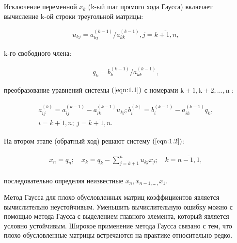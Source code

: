 \documentclass[a4paper]{article}
\begin{document}
Исключение переменной $x_{k}$ (k-ый шаг прямого хода Гаусса) включает вычисление k-ой строки треугольной матрицы:

\begin{equation}
    \label{eqn:1.3}
    \begin{aligned}
        u_{k j}=a_{k j}^{(k-1)} / a_{k k}^{(k-1)}, j=\overline{k+1, n},
    \end{aligned}
\end{equation}

$\mathrm{k}$-го свободного члена:

\begin{equation}
    \label{eqn:1.4}
    \begin{aligned}
        q_{k}=b_{k}^{(k-1)} / a_{k k}^{(k-1)},
    \end{aligned}
\end{equation}

преобразование уравнений системы $(\ref{eqn:1.1})$ с номерами $\mathrm{k}+1, \mathrm{k}+2, \ldots, \mathrm{n}$ :

\begin{equation}
    \label{eqn:1.5}
    \begin{aligned}
        \begin{gathered}
            a_{i j}^{(k)}=a_{i j}^{(k-1)}-a_{i k}^{(k-1)} u_{k j} ; b_{i}^{(k)}=b_{i}^{(k-1)}-a_{i k}^{(k-1)} q_{k}, \\
            i=\overline{k+1, n} ; \ j=\overline{k+1, n} .
        \end{gathered}
    \end{aligned}
\end{equation}

На втором этапе (обратный ход) решают систему $(\ref{eqn:1.2})$:

\begin{equation}
    \label{eqn:1.6}
    \begin{aligned}
        \begin{gathered}
            x_{n}=q_{n} ; \quad x_{k}=q_{k}-\sum_{j=k+1}^{n} u_{k j} x_{j} ; \quad k=\overline{n-1,1},
        \end{gathered}
    \end{aligned}
\end{equation}

последовательно определяя неизвестные $x_{n}, x_{n-1, \ldots,} x_{1}$.

Метод Гаусса для плохо обусловленных матриц коэффициентов является вычислительно неустойчивым. Уменьшить вычислительную ошибку можно с помощью метода Гаусса с выделением главного элемента, который является условно устойчивым. Широкое применение метода Гаусса связано с тем, что плохо обусловленные матрицы встречаются на практике относительно редко.
\end{document}

